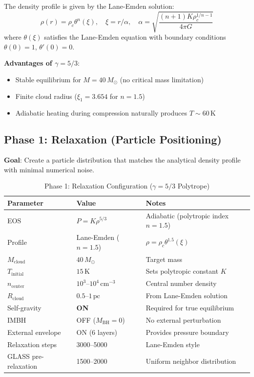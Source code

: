 \documentclass[11pt,a4paper]{article}
\newcommand{\Msun}{M_\odot}
\newcommand{\pc}{\,\mathrm{pc}}
\newcommand{\cmcubed}{\,\mathrm{cm^{-3}}}
\begin{document}
The density profile is given by the Lane-Emden solution:
\begin{equation}
    \rho(r) = \rho_c \theta^{n}(\xi), \quad \xi = r/\alpha, \quad \alpha = \sqrt{\frac{(n+1)K\rho_c^{1/n-1}}{4\pi G}}
\end{equation}
where $\theta(\xi)$ satisfies the Lane-Emden equation with boundary conditions
$\theta(0) = 1$, $\theta'(0) = 0$.

\textbf{Advantages of $\gamma = 5/3$}:
\begin{itemize}
    \item Stable equilibrium for $M = 40\,\Msun$ (no critical mass limitation)
    \item Finite cloud radius ($\xi_1 = 3.654$ for $n = 1.5$)
    \item Adiabatic heating during compression naturally produces $T \sim 60\,\mathrm{K}$
\end{itemize}

\subsection{Phase 1: Relaxation (Particle Positioning)}

\textbf{Goal}: Create a particle distribution that matches the analytical density
profile with minimal numerical noise.

\begin{table}[h]
\centering
\caption{Phase 1: Relaxation Configuration ($\gamma = 5/3$ Polytrope)}
\begin{tabular}{lll}
\toprule
\textbf{Parameter} & \textbf{Value} & \textbf{Notes} \\
\midrule
EOS & $P = K\rho^{5/3}$ & Adiabatic (polytropic index $n = 1.5$) \\
Profile & Lane-Emden ($n = 1.5$) & $\rho = \rho_c \theta^{1.5}(\xi)$ \\
$M_\mathrm{cloud}$ & $40\,\Msun$ & Target mass \\
$T_\mathrm{initial}$ & $15\,\mathrm{K}$ & Sets polytropic constant $K$ \\
$n_\mathrm{center}$ & $10^3$--$10^4\cmcubed$ & Central number density \\
$R_\mathrm{cloud}$ & $0.5$--$1\pc$ & From Lane-Emden solution \\
\midrule
Self-gravity & \textbf{ON} & Required for true equilibrium \\
IMBH & OFF ($M_\mathrm{BH} = 0$) & No external perturbation \\
External envelope & ON (6 layers) & Provides pressure boundary \\
\midrule
Relaxation steps & 3000--5000 & Lane-Emden style \\
GLASS pre-relaxation & 1500--2000 & Uniform neighbor distribution \\
\bottomrule
\end{tabular}
\end{table}
\end{document}
